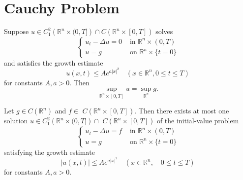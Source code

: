 \section{Cauchy Problem}
\begin{theorem}
    Suppose $u \in C_1^2\left(\mathbb{R}^n \times(0, T]\right) \cap C\left(\mathbb{R}^n \times[0, T]\right)$ solves
    \begin{equation*}
        \left\{\begin{aligned}
            u_t-\Delta u=0 & \text { in } \mathbb{R}^n \times(0, T)  \\
            u=g            & \text { on } \mathbb{R}^n \times\{t=0\}
        \end{aligned}\right.
    \end{equation*}
    and satisfies the growth estimate
    \begin{equation*}
        u(x, t) \leq A e^{a|x|^2} \quad\left(x \in \mathbb{R}^n, 0 \leq t \leq T\right)
    \end{equation*}
    for constants $A, a>0$. Then
    \begin{equation*}
        \sup _{\mathbb{R}^n \times[0, T]} u=\sup _{\mathbb{R}^n} g .
    \end{equation*}
\end{theorem}
\begin{corollary}
    Let $g \in C\left(\mathbb{R}^n\right)$ and $f \in$ $C\left(\mathbb{R}^n \times[0, T]\right)$.
    Then there exists at most one solution $u \in C_1^2\left(\mathbb{R}^n \times(0, T]\right) \cap$ $C\left(\mathbb{R}^n \times[0, T]\right)$ of the initial-value problem
    \begin{equation*}
        \left\{\begin{aligned}
            u_t-\Delta u=f & \text { in } \mathbb{R}^n \times(0, T)  \\
            u=g            & \text { on } \mathbb{R}^n \times\{t=0\}
        \end{aligned}\right.
    \end{equation*}
    satisfying the growth estimate
    \begin{equation*}
        |u(x, t)| \leq A e^{a|x|^2} \quad\left(x \in \mathbb{R}^n, \quad 0 \leq t \leq T\right)
    \end{equation*}
    for constants $A, a>0$.
\end{corollary}

